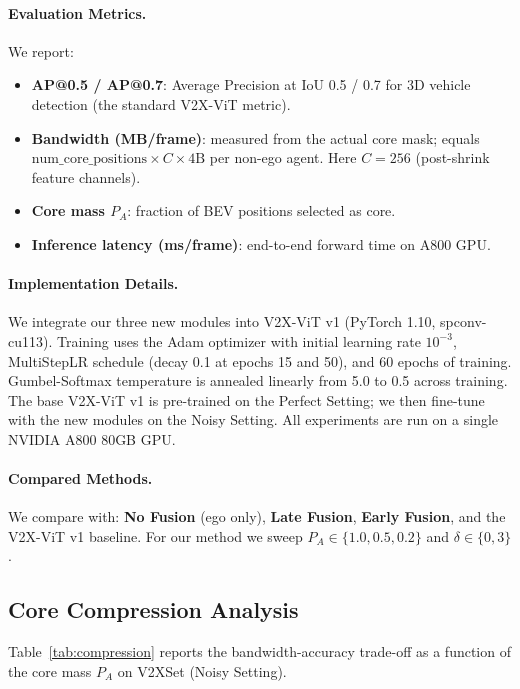 \paragraph{Evaluation Metrics.}
We report:
\begin{itemize}
    \item \textbf{AP@0.5 / AP@0.7}: Average Precision at IoU 0.5 / 0.7 for
          3D vehicle detection (the standard V2X-ViT metric).
    \item \textbf{Bandwidth (MB/frame)}: measured from the actual core mask;
          equals $\text{num\_core\_positions} \times C \times 4\text{B}$ per
          non-ego agent. Here $C = 256$ (post-shrink feature channels).
    \item \textbf{Core mass $P_A$}: fraction of BEV positions selected as core.
    \item \textbf{Inference latency (ms/frame)}: end-to-end forward time on
          A800 GPU.
\end{itemize}

\paragraph{Implementation Details.}
We integrate our three new modules into V2X-ViT v1 (PyTorch 1.10,
spconv-cu113). Training uses the Adam optimizer with initial learning rate
$10^{-3}$, MultiStepLR schedule (decay 0.1 at epochs 15 and 50), and
60 epochs of training. Gumbel-Softmax temperature is annealed linearly
from 5.0 to 0.5 across training. The base V2X-ViT v1 is pre-trained on
the Perfect Setting; we then fine-tune with the new modules on the Noisy
Setting. All experiments are run on a single NVIDIA A800 80GB GPU.

\paragraph{Compared Methods.}
We compare with: \textbf{No Fusion} (ego only), \textbf{Late Fusion},
\textbf{Early Fusion}, and the V2X-ViT v1 baseline. For our method we
sweep $P_A \in \{1.0, 0.5, 0.2\}$ and $\delta \in \{0, 3\}$.

\subsection{Core Compression Analysis}
\label{sec:exp-compression}

Table~\ref{tab:compression} reports the bandwidth-accuracy trade-off as a
function of the core mass $P_A$ on V2XSet (Noisy Setting).

